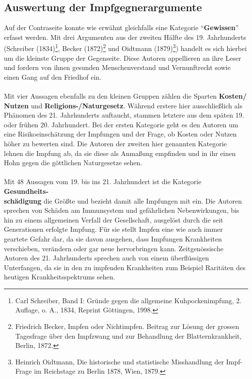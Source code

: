 \documentclass[
    a4paper,
    12pt,
    hyphens,
    chapterprefix=true,
    headheight=33pt,
    footheight=29pt,
    headings=optiontohead,
]{scrartcl}
\begin{document}
{\subsection{Auswertung der Impfgegnerargumente}
Auf der Contraseite konnte wie erwähnt gleichfalls eine Kategorie "`\textbf{Gewissen}"' erfasst werden. Mit drei Argumenten aus der zweiten Hälfte des 19. Jahrhunderts (Schreiber (1834)\footnote{Carl Schreiber, Band I: Gründe gegen die allgemeine Kuhpockenimpfung, 2. Auflage, o. A., 1834, Reprint Göttingen, 1998.}, Becker (1872)\footnote{Friedrich Becker, Impfen oder Nichtimpfen. Beitrag zur Lösung der grossen Tagesfrage über den Impfzwang und zur Behandlung der Blatternkrankheit, Berlin, 1872.} und Oidtmann (1879)\footnote{Heinrich Oidtmann, Die historische und statistische Misshandlung der Impf-Frage im Reichstage zu Berlin 1878, Wien, 1879.}) handelt es sich hierbei um die kleinste Gruppe der Gegenseite. Diese Autoren appellieren an ihre Leser und fordern von ihnen gesunden Menschenverstand und Vernunftrecht sowie einen Gang auf den Friedhof ein.\\
\\
Mit vier Aussagen ebenfalls zu den kleinen Gruppen zählen die Sparten \textbf{Kosten/\\Nutzen} und \textbf{Religions-/Naturgesetz}. Während erstere hier ausschließlich als Phänomen des 21. Jahrhunderts auftaucht, stammen letztere aus dem späten 19. oder frühen 20. Jahrhundert. Bei der ersten Kategorie geht es den Autoren um eine Risikoeinschätzung der Impfungen und der Frage, ob Kosten oder Nutzen höher zu bewerten sind. Die Autoren der zweiten hier genannten Kategorie lehnen die Impfung ab, da sie diese als Anmaßung empfinden und in ihr einen Hohn gegen die göttlichen Naturgesetze sehen.\\
\\
Mit 48 Aussagen vom 19. bis ins 21. Jahrhundert ist die Kategorie \textbf{Gesundheits-\\schädigung} die Größte  und bezieht damit alle Impfungen mit ein. Die Autoren sprechen von Schäden am Immunsystem und gefährlichen Nebenwirkungen, bis hin zu einem allgemeinen Verfall der Gesellschaft, ausgelöst durch die seit Generationen erfolgte Impfung. Für sie stellt Impfen eine wie auch immer geartete Gefahr dar, da sie davon ausgehen, dass Impfungen Krankheiten verschieben, verändern oder gar neue hervorbringen kann. Zeitgenössische Autoren des 21. Jahrhunderts sprechen auch von einem überflüssigen Unterfangen, da sie in den zu impfenden Krankheiten zum Beispiel Raritäten des heutigen Krankheitsspektrums sehen.\\
}
\end{document}
